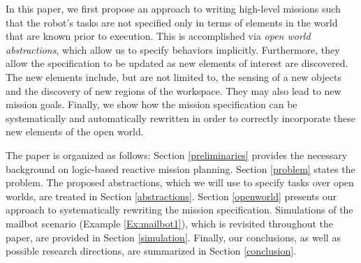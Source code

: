 In this paper, we first propose an approach to writing high-level missions such that the robot's tasks are not specified only in terms of elements in the world that are known prior to execution. This is accomplished via \emph{open world abstractions}, which allow us to specify behaviors implicitly. 
Furthermore, they allow the specification to be updated as new elements of interest are discovered. The new elements include, but are not limited to, the sensing of a new objects and the discovery of new regions of the workspace. They may also lead to new mission goals.
Finally, we show how the mission specification can be systematically and automatically rewritten in order to correctly incorporate these new elements of the open world. 

The paper is organized as follows: Section \ref{preliminaries} provides the necessary background on logic-based reactive mission planning. Section \ref{problem} states the problem. The proposed abstractions, which we will use to specify tasks over open worlds, are treated in Section \ref{abstractions}. Section \ref{openworld} presents our approach to systematically rewriting the mission specification. Simulations of the mailbot scenario (Example \ref{Ex:mailbot1}), which is revisited throughout the paper, are provided in Section \ref{simulation}. Finally, our conclusions, as well as possible research directions, are summarized in Section \ref{conclusion}.

